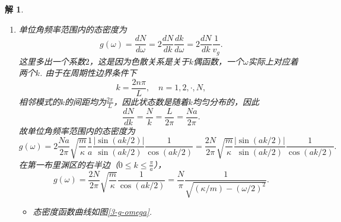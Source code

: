 \documentclass[UTF8,10pt,a4paper]{article}
\theoremstyle{Problem}
\theoremstyle{Solution}
\newtheorem*{sol}{解}
\providecommand{\abs}[1]{\left\lvert#1\right\rvert}
\begin{document}
\begin{sol}
\begin{enumerate}
\begin{itemize}
            \begin{gather}
                \frac{1}{\beta}=-L\frac{\partial F}{\partial L}=-Na\frac{\partial F}{\partial(Na)}=-a\frac{\partial F}{\partial a}=-a\kappa,\\
                \Longrightarrow\kappa=-\frac{1}{a\beta}.
            \end{gather}
            一维原子链的线密度定义为
            \begin{equation}
                \rho=\frac{m}{a}.
            \end{equation}
            将上面两式代入式\eqref{3-sound-velocity}中可得
            \begin{equation}
                v=\sqrt{\frac{1}{\beta\rho}}.
            \end{equation}
        \end{itemize}
        \item[(e)] 单位角频率范围内的态密度为
        \begin{equation}
            g(\omega)=\frac{dN}{d\omega}=2\frac{dN}{dk}\frac{dk}{d\omega}=2\frac{dN}{dk}\frac{1}{v_g}.
        \end{equation}
        这里多出一个系数$2$，这是因为色散关系是关于$k$偶函数，一个$\omega$实际上对应着两个$k$.
        由于在周期性边界条件下
        \begin{equation}
            k=\frac{2n\pi}{L},\quad n=1,2,\cdot,N,
        \end{equation}
        相邻模式的$k$的间距均为$\frac{2\pi}{L}$，因此状态数是随着$k$均匀分布的，因此
        \begin{equation}
            \frac{dN}{dk}=\frac{N}{k}=\frac{L}{2\pi}=\frac{Na}{2\pi}.
        \end{equation}
        故单位角频率范围内的态密度为
        \begin{equation}
            g(\omega)=2\frac{Na}{2\pi}\sqrt{\frac{m}{\kappa}}\frac{1}{a}\frac{\abs{\sin(ak/2)}}{\sin(ak/2)}\frac{1}{\cos(ak/2)}=\frac{2N}{2\pi}\sqrt{\frac{m}{\kappa}}\frac{\abs{\sin(ak/2)}}{\sin(ak/2)}\frac{1}{\cos(ak/2)}.
        \end{equation}
        在第一布里渊区的右半边（$0\leq k\leq \frac{\pi}{a}$），
        \begin{equation}
            g(\omega)=\frac{2N}{2\pi}\sqrt{\frac{m}{\kappa}}\frac{1}{\cos(ak/2)}=\frac{N}{\pi}\frac{1}{\sqrt{(\kappa/m)-(\omega/2)^2}}.
        \end{equation}
        \begin{itemize}
            \item[$\triangleright$] 态密度函数曲线如图\ref{3-g-omega}.

\end{itemize}
\end{enumerate}
\end{sol}
\end{document}
